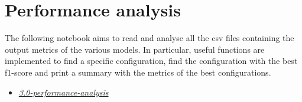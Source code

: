 \documentclass[../main]{subfiles}
\begin{document}
\section{Performance analysis}
The following notebook aims to read and analyse all the csv files containing the output metrics of the various models.
In particular, useful functions are implemented to find a specific configuration, find the configuration with the best f1-score and print a summary with the metrics of the best configurations.
\begin{itemize}
    \item \href{https://github.com/prushh/movie-lens-mlp/blob/main/notebooks/3.0-performance-analysis.ipynb}{\textit{3.0-performance-analysis}}
\end{itemize}
\end{document}
